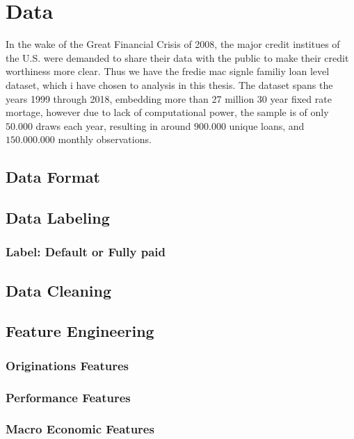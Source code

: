 \chapter{Data}
In the wake of the Great Financial Crisis of 2008, the major credit institues of the U.S. were demanded to share their data with the public to make their credit worthiness more clear. Thus we have the fredie mac signle familiy loan level dataset, which i have chosen to analysis in this thesis. The dataset spans the years 1999 through 2018, embedding more than 27 million 30 year fixed rate mortage, however due to lack of computational power, the sample is of only $50.000$ draws each year, resulting in around $900.000$ unique loans, and $150.000.000$ monthly observations.

\section{Data Format}

    \section{Data Labeling}

        \subsection{Label: Default or Fully paid}

    \section{Data Cleaning}

    \section{Feature Engineering}

        \subsection{Originations Features}
        
        \subsection{Performance Features}
        
        \subsection{Macro Economic Features}
        
